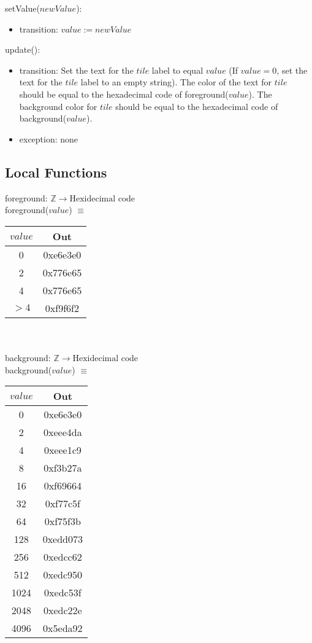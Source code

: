 \documentclass[12pt]{article}
\begin{document}
\noindent setValue($newValue$):
\begin{itemize}
\item transition: $value := newValue$
\end{itemize}

\noindent update():
\begin{itemize}
\item transition: Set the text for the $tile$ label to equal $value$ (If $value = 0$, set the text for the $tile$ label to an empty string). The color of the text for $tile$ should be equal to the hexadecimal code of foreground($value$). The background color for $tile$ should be equal to the hexadecimal code of background($value$).
\item exception: none
\end{itemize}

\subsection* {Local Functions}
\noindent foreground: $\mathbb{Z} \rightarrow \text{Hexidecimal code}$ \\
\noindent foreground($value$) $\equiv $ \\
\begin{tabular}{|c|c|}
 $value$ & \textbf{Out} \\ \hline
 0 & 0xe6e3e0 \\ \hline
 2 & 0x776e65 \\ \hline 
 4 & 0x776e65 \\ \hline
 $> 4$ & 0xf9f6f2 \\ \hline
\end{tabular} \\ \\

\noindent background: $\mathbb{Z} \rightarrow \text{Hexidecimal code}$ \\
\noindent background($value$) $\equiv $ \\
\begin{tabular}{|c|c|}
 $value$ & \textbf{Out} \\ \hline
 0 & 0xe6e3e0 \\ \hline
 2 & 0xeee4da \\ \hline 
 4 & 0xeee1c9 \\ \hline
 8 & 0xf3b27a \\ \hline
 16 & 0xf69664 \\ \hline
 32 & 0xf77c5f \\ \hline
 64 & 0xf75f3b \\ \hline
 128 & 0xedd073 \\ \hline
 256 & 0xedcc62 \\ \hline
 512 & 0xedc950 \\ \hline
 1024 & 0xedc53f \\ \hline
 2048 & 0xedc22e \\ \hline
 4096 & 0x5eda92 \\ \hline
\end{tabular}
\end{document}
